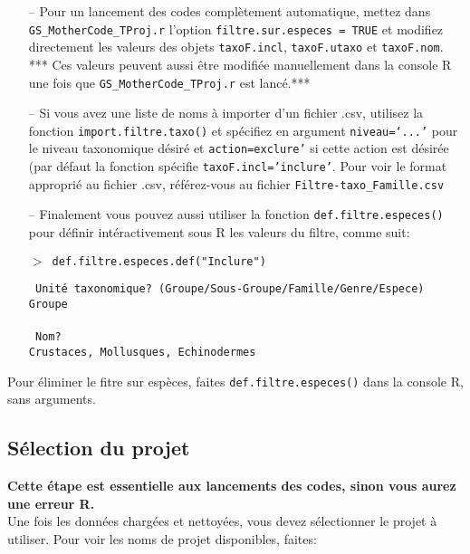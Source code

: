 \documentclass{article}
\newcommand{\mcode} {\texttt{GS\_MotherCode\_TProj.r}{ }}
\begin{document}
\begin{itemize}
\item[--] Pour un lancement des codes complètement automatique, mettez dans
\mcode l'option \texttt{filtre.sur.especes =  TRUE} et modifiez
directement les valeurs des objets
\texttt{taxoF.incl}, \texttt{taxoF.utaxo} et \texttt{taxoF.nom}. *** Ces
valeurs peuvent aussi être modifiée manuellement dans la console R une
fois que \mcode{} est lancé.***
\item[--] \label{impFtaxo}Si vous avez une liste de noms à importer
d'un fichier .csv, utilisez la fonction \texttt{import.filtre.taxo()}
et spécifiez en argument \texttt{niveau=`...'} pour le niveau
taxonomique désiré et \texttt{action=exclure'} si cette action est
désirée (par défaut la fonction spécifie
\texttt{taxoF.incl='inclure'}. Pour voir le format approprié au
fichier .csv, référez-vous au fichier \texttt{Filtre-taxo\_Famille.csv}
\item[--] Finalement vous pouvez aussi utiliser
la fonction \texttt{def.filtre.especes()} pour définir intéractivement
sous R les valeurs du filtre, comme suit:


\texttt{$>$ def.filtre.especes.def("Inclure")}

\indent \texttt{\color{MidnightBlue} Unité taxonomique? (Groupe/Sous-Groupe/Famille/Genre/Espece)} \\
\indent \indent \texttt{Groupe}\\
\\
\indent \texttt{\color{MidnightBlue} Nom?} \\
\indent \indent \texttt{Crustaces, Mollusques, Echinodermes}\\
\end{itemize}

Pour éliminer le fitre sur espèces, faites
\texttt{def.filtre.especes()} dans la console R, sans arguments.

\subsection{Sélection du projet}

\ra \textbf{Cette étape est essentielle aux lancements des codes, sinon vous
aurez une erreur R.}\\

Une fois les données chargées et nettoyées, vous devez sélectionner le
projet à utiliser. Pour voir les noms de projet disponibles, faites:\\

 \\
\end{document}
